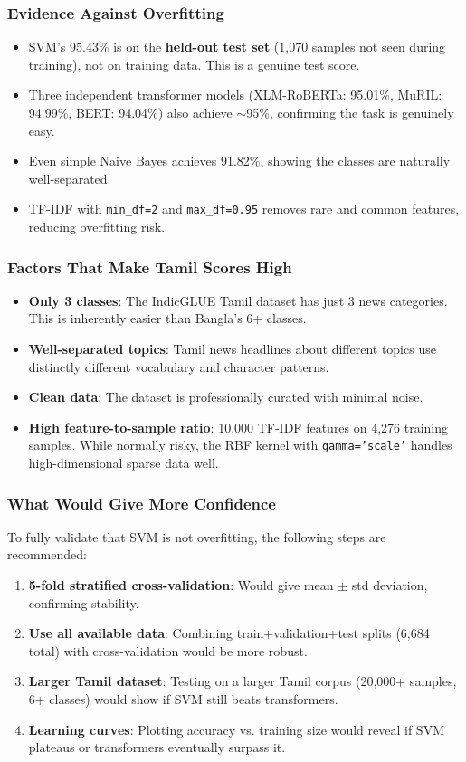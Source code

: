 \documentclass[conference]{IEEEtran}
\begin{document}
\subsubsection{Evidence Against Overfitting}
\begin{itemize}
\item SVM's 95.43\% is on the \textbf{held-out test set} (1,070 samples not seen during training), not on training data. This is a genuine test score.
\item Three independent transformer models (XLM-RoBERTa: 95.01\%, MuRIL: 94.99\%, BERT: 94.04\%) also achieve $\sim$95\%, confirming the task is genuinely easy.
\item Even simple Naive Bayes achieves 91.82\%, showing the classes are naturally well-separated.
\item TF-IDF with \texttt{min\_df=2} and \texttt{max\_df=0.95} removes rare and common features, reducing overfitting risk.
\end{itemize}

\subsubsection{Factors That Make Tamil Scores High}
\begin{itemize}
\item \textbf{Only 3 classes}: The IndicGLUE Tamil dataset has just 3 news categories. This is inherently easier than Bangla's 6+ classes.
\item \textbf{Well-separated topics}: Tamil news headlines about different topics use distinctly different vocabulary and character patterns.
\item \textbf{Clean data}: The dataset is professionally curated with minimal noise.
\item \textbf{High feature-to-sample ratio}: 10,000 TF-IDF features on 4,276 training samples. While normally risky, the RBF kernel with \texttt{gamma='scale'} handles high-dimensional sparse data well.
\end{itemize}

\subsubsection{What Would Give More Confidence}
To fully validate that SVM is not overfitting, the following steps are recommended:
\begin{enumerate}
\item \textbf{5-fold stratified cross-validation}: Would give mean $\pm$ std deviation, confirming stability.
\item \textbf{Use all available data}: Combining train+validation+test splits (6,684 total) with cross-validation would be more robust.
\item \textbf{Larger Tamil dataset}: Testing on a larger Tamil corpus (20,000+ samples, 6+ classes) would show if SVM still beats transformers.
\item \textbf{Learning curves}: Plotting accuracy vs. training size would reveal if SVM plateaus or transformers eventually surpass it.
\end{enumerate}
\end{document}
